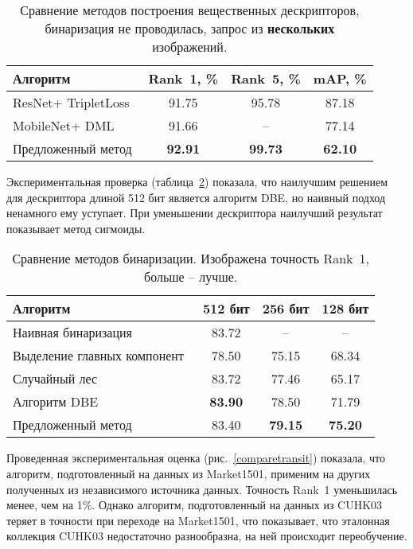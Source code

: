 \documentclass[a4paper,twoside,11pt]{article}
\numberwithin{equation}{section}
\begin{document}
\begin{table}[ht]\small
    \caption{Сравнение методов построения вещественных дескрипторов, бинаризация не проводилась, запрос из \textbf{нескольких} изображений.}
    \label{comparemultiple}
    \centering\medskip%
    \begin{tabular}{ p{2.6cm} c c c } 
        \hline 
        Алгоритм & Rank~1, \% & Rank~5, \% & mAP, \% \\
        \hline
        ResNet+ TripletLoss~\cite{hermans2017defense} & 91.75 & 95.78 & 87.18 \\
        MobileNet+ DML~\cite{zhang2017deep} & 91.66 & -- & 77.14 \\
        Предложенный метод & \textbf{92.91} & \textbf{99.73} & \textbf{62.10} \\
        \hline
    \end{tabular}
\end{table}

Экспериментальная проверка (таблица~\ref{comparebinarization}) показала, что наилучшим решением для дескриптора длиной 512 бит является алгоритм DBE, но наивный подход ненамного ему уступает. При уменьшении дескриптора наилучший результат показывает метод сигмоиды.

\begin{table}[ht]\small
    \caption{Сравнение методов бинаризации. Изображена точность Rank~1, больше -- лучше.}
    \label{comparebinarization}
    \centering\medskip%
    \begin{tabular}{ p{2.8cm} c c c } 
        \hline 
        Алгоритм & 512 бит & 256 бит & 128 бит \\
        \hline
        Наивная бинаризация & 83.72 & -- & -- \\
        Выделение главных компонент~\cite{halko2011finding} & 78.50 & 75.15 & 68.34 \\
        Случайный лес~\cite{breiman2001random} & 83.72 & 77.46 & 65.17 \\
        Алгоритм DBE~\cite{liu2017end} & \textbf{83.90} & 78.50 & 71.79 \\
        Предложенный метод & 83.40 & \textbf{79.15} & \textbf{75.20} \\
        \hline
    \end{tabular}
\end{table}

Проведенная экспериментальная оценка (рис.~\ref{comparetransit}) показала, что алгоритм, подготовленный на данных из Market1501, применим на других полученных из независимого источника данных. Точность Rank~1 уменьшилась менее, чем на 1\%. Однако алгоритм, подготовленный на данных из CUHK03 теряет в точности при переходе на Market1501, что показывает, что эталонная коллекция CUHK03 недостаточно разнообразна, на ней происходит переобучение.
\end{document}
